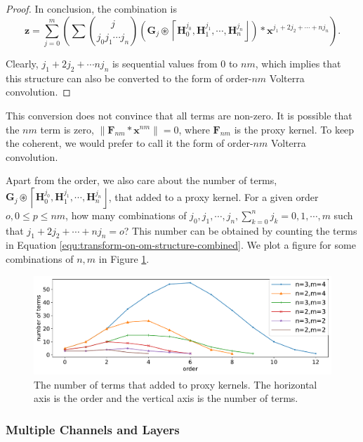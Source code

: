 \documentclass[twoside,11pt]{article}
\def\oconv{\circledast}
\def\tvar#1{\mathbf{#1}} %
\def\lcerfl#1{\left\lceil{#1}\right\rfloor}
\begin{document}
\begin{proof}
  In conclusion, the combination is
  \begin{equation}
    \tvar{z}
    = \sum_{j=0}^{m} \left( \sum \binom{j}{j_0 j_1 \cdots j_n}
    \left( \tvar{G}_j \oconv \lcerfl{\tvar{H}_0^{j_0}, \tvar{H}_1^{j_1}, \cdots, \tvar{H}_n^{j_n}} \right)
    * \tvar{x}^{j_1 + 2 j_2 + \cdots + n j_n} \right).
    \label{equ:transform-on-om-structure-combined}
  \end{equation}

  Clearly, \(j_1 + 2 j_2 + \cdots n j_n\) is sequential values from \(0\) to \(nm\), which implies that this structure can also be converted to the form of order-\(nm\) Volterra convolution.
\end{proof}

This conversion does not convince that all terms are non-zero. It is possible that the \(nm\) term is zero, \(\|\tvar{F}_{nm} * \tvar{x}^{nm} \| = 0\), where \(\tvar{F}_{nm}\) is the proxy kernel. To keep the coherent, we would prefer to call it the form of order-\(nm\) Volterra convolution.

Apart from the order, we also care about the number of terms, \(\tvar{G}_j \oconv \lcerfl{\tvar{H}_0^{j_0}, \tvar{H}_1^{j_1}, \cdots, \tvar{H}_n^{j_n}}\), that added to a proxy kernel.
For a given order \(o, 0 \le p \le nm\), how many combinations of \(j_0, j_1, \cdots, j_n, \sum_{k=0}^{n} j_k = 0, 1, \cdots, m\) such that \(j_1 + 2j_2 + \cdots + nj_n = o\)? This number can be obtained by counting the terms in Equation \ref{equ:transform-on-om-structure-combined}. We plot a figure for some combinations of \(n,m\) in Figure \ref{fig:conv-multinomial}.

\begin{figure}[htb]
  \centering
  \includegraphics[width=0.9\linewidth]{img/conv-multinomial.pdf}
  \caption{The number of terms that added to proxy kernels. The horizontal axis is the order and the vertical axis is the number of terms.}
  \label{fig:conv-multinomial}
\end{figure}


\subsubsection{Multiple Channels and Layers}
\label{subsubsec:combine-many-layers}
\end{document}
